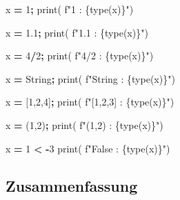 \documentclass[
  oneside]{book}
\newenvironment{Shaded}{\begin{snugshade}}{\end{snugshade}}
\newcommand{\BuiltInTok}[1]{#1}
\newcommand{\DecValTok}[1]{\textcolor[rgb]{0.00,0.00,0.81}{#1}}
\newcommand{\FloatTok}[1]{\textcolor[rgb]{0.00,0.00,0.81}{#1}}
\newcommand{\NormalTok}[1]{#1}
\newcommand{\OperatorTok}[1]{\textcolor[rgb]{0.81,0.36,0.00}{\textbf{#1}}}
\newcommand{\SpecialCharTok}[1]{\textcolor[rgb]{0.00,0.00,0.00}{#1}}
\newcommand{\SpecialStringTok}[1]{\textcolor[rgb]{0.31,0.60,0.02}{#1}}
\newcommand{\StringTok}[1]{\textcolor[rgb]{0.31,0.60,0.02}{#1}}
\begin{document}
\begin{Shaded}
\begin{Highlighting}[]
\NormalTok{x }\OperatorTok{=} \DecValTok{1}\OperatorTok{;} 
\BuiltInTok{print}\NormalTok{( }\SpecialStringTok{f"1 : }\SpecialCharTok{\{}\BuiltInTok{type}\NormalTok{(x)}\SpecialCharTok{\}}\SpecialStringTok{"}\NormalTok{)}

\NormalTok{x }\OperatorTok{=} \FloatTok{1.1}\OperatorTok{;} 
\BuiltInTok{print}\NormalTok{( }\SpecialStringTok{f"1.1 : }\SpecialCharTok{\{}\BuiltInTok{type}\NormalTok{(x)}\SpecialCharTok{\}}\SpecialStringTok{"}\NormalTok{)}

\NormalTok{x }\OperatorTok{=} \DecValTok{4}\OperatorTok{/}\DecValTok{2}\OperatorTok{;} 
\BuiltInTok{print}\NormalTok{( }\SpecialStringTok{f"4/2 : }\SpecialCharTok{\{}\BuiltInTok{type}\NormalTok{(x)}\SpecialCharTok{\}}\SpecialStringTok{"}\NormalTok{)}

\NormalTok{x }\OperatorTok{=} \StringTok{\textquotesingle{}String\textquotesingle{}}\OperatorTok{;} 
\BuiltInTok{print}\NormalTok{( }\SpecialStringTok{f"\textquotesingle{}String\textquotesingle{} : }\SpecialCharTok{\{}\BuiltInTok{type}\NormalTok{(x)}\SpecialCharTok{\}}\SpecialStringTok{"}\NormalTok{)}

\NormalTok{x }\OperatorTok{=}\NormalTok{ [}\DecValTok{1}\NormalTok{,}\DecValTok{2}\NormalTok{,}\DecValTok{4}\NormalTok{]}\OperatorTok{;} 
\BuiltInTok{print}\NormalTok{( }\SpecialStringTok{f"[1,2,3] : }\SpecialCharTok{\{}\BuiltInTok{type}\NormalTok{(x)}\SpecialCharTok{\}}\SpecialStringTok{"}\NormalTok{)}

\NormalTok{x }\OperatorTok{=}\NormalTok{ (}\DecValTok{1}\NormalTok{,}\DecValTok{2}\NormalTok{)}\OperatorTok{;}
\BuiltInTok{print}\NormalTok{( }\SpecialStringTok{f"(1,2) : }\SpecialCharTok{\{}\BuiltInTok{type}\NormalTok{(x)}\SpecialCharTok{\}}\SpecialStringTok{"}\NormalTok{)}

\NormalTok{x }\OperatorTok{=} \DecValTok{1} \OperatorTok{\textless{}} \OperatorTok{{-}}\DecValTok{3}
\BuiltInTok{print}\NormalTok{( }\SpecialStringTok{f"False : }\SpecialCharTok{\{}\BuiltInTok{type}\NormalTok{(x)}\SpecialCharTok{\}}\SpecialStringTok{"}\NormalTok{)}
\end{Highlighting}
\end{Shaded}

\hypertarget{zusammenfassung}{%
\subsection{Zusammenfassung}\label{zusammenfassung}}
\end{document}
